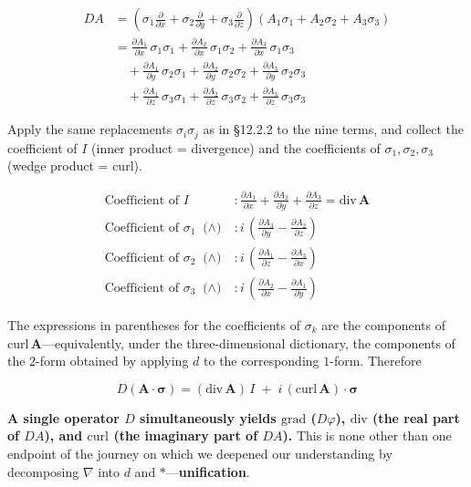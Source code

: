 \documentclass[a4paper,12pt,openany]{book}
\begin{document}
\[
\begin{aligned}
D A &= (\sigma_1\tfrac{\partial}{\partial x} + \sigma_2\tfrac{\partial}{\partial y} + \sigma_3\tfrac{\partial}{\partial z})(A_1\sigma_1 + A_2\sigma_2 + A_3\sigma_3) \\[4pt]
&= \tfrac{\partial A_1}{\partial x}\,\sigma_1\sigma_1 + \tfrac{\partial A_2}{\partial x}\,\sigma_1\sigma_2 + \tfrac{\partial A_3}{\partial x}\,\sigma_1\sigma_3 \\
&\quad + \tfrac{\partial A_1}{\partial y}\,\sigma_2\sigma_1 + \tfrac{\partial A_2}{\partial y}\,\sigma_2\sigma_2 + \tfrac{\partial A_3}{\partial y}\,\sigma_2\sigma_3 \\
&\quad + \tfrac{\partial A_1}{\partial z}\,\sigma_3\sigma_1 + \tfrac{\partial A_2}{\partial z}\,\sigma_3\sigma_2 + \tfrac{\partial A_3}{\partial z}\,\sigma_3\sigma_3
\end{aligned}
\]

Apply the same replacements \(\sigma_i\sigma_j\) as in §12.2.2 to the
nine terms, and collect the coefficient of \(I\) (inner product =
divergence) and the coefficients of \(\sigma_1,\sigma_2,\sigma_3\)
(wedge product = curl).

\[
\begin{aligned}
\text{Coefficient of }I &: \frac{\partial A_1}{\partial x} + \frac{\partial A_2}{\partial y} + \frac{\partial A_3}{\partial z} = \mathrm{div}\,\mathbf{A} \\
\text{Coefficient of }\sigma_1\text{ ($\wedge$)} &: i\,\left(\frac{\partial A_3}{\partial y} - \frac{\partial A_2}{\partial z}\right) \\
\text{Coefficient of }\sigma_2\text{ ($\wedge$)} &: i\,\left(\frac{\partial A_1}{\partial z} - \frac{\partial A_3}{\partial x}\right) \\
\text{Coefficient of }\sigma_3\text{ ($\wedge$)} &: i\,\left(\frac{\partial A_2}{\partial x} - \frac{\partial A_1}{\partial y}\right)
\end{aligned}
\]

The expressions in parentheses for the coefficients of \(\sigma_k\) are
the components of \(\mathrm{curl}\,\mathbf{A}\)—equivalently, under
the three-dimensional dictionary, the components of the \(2\)-form
obtained by applying \(d\) to the corresponding \(1\)-form. Therefore

\[D(\mathbf{A}\!\cdot\!\bm{\sigma}) = (\mathrm{div}\,\mathbf{A})\,I \;+\; i\,(\mathrm{curl}\,\mathbf{A})\!\cdot\!\bm{\sigma}\]

\textbf{A single operator \(D\) simultaneously yields \(\mathrm{grad}\)
(\(D\varphi\)), \(\mathrm{div}\) (the real part of \(DA\)), and
\(\mathrm{curl}\) (the imaginary part of \(DA\)).} This is none other
than one endpoint of the journey on which we deepened our understanding
by decomposing \(\nabla\) into \(d\) and
\(\ast\)—\textbf{unification}.
\end{document}
